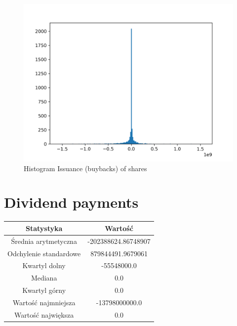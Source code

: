 \documentclass{article}
\begin{document}
\begin{figure}[h!]
    \includegraphics[width=\linewidth]{variables/Issuance (buybacks) of shares.png}
    \caption{Histogram Issuance (buybacks) of shares }
\end{figure}\section{ Dividend payments }

\begin{center}
    \begin{tabular}{|c | c|} 
    \hline
    Statystyka & Wartość \\
    \hline\hline
    Średnia arytmetyczna & -202388624.86748907 \\ 
    \hline
    Odchylenie standardowe & 879844491.9679061 \\
    \hline
    Kwartyl dolny & -55548000.0 \\
    \hline
    Mediana & 0.0 \\
    \hline
    Kwartyl górny & 0.0 \\
    \hline
    Wartość najmniejsza & -13798000000.0 \\
    \hline
    Wartość największa & 0.0 \\
    \hline
   \end{tabular}
\end{center}
\end{document}
